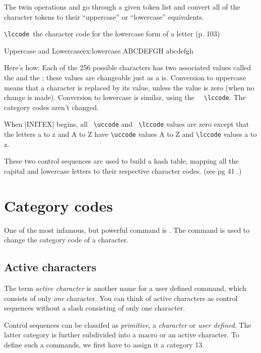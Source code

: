 The twin operations  and 
go through a given token list and convert all of the character tokens to their
\enquote{uppercase}  or \enquote{lowercase} equivalents.

\verb*+\lccode +the character code for the lowercase form of a letter (p. 103)

\begin{texexample}{Uppercase and Lowercase}{ex:lowercase} 
\uppercase{abcdefgh} 
\lowercase{ABCDEFGH}
\end{texexample}

Here's how: Each of the 256 possible characters has two associated values called the \cmd{\uccode} and the \cmd{\lccode}; these values are
changeable just as a \cmd{\catcode} is. Conversion to uppercase means that a character
is replaced by its \cmd{\uccode} value, unless the \cmd{\uccode} value is zero (when no change
is made). Conversion to lowercase is similar, using the
\verb+  \lccode+. The category codes
aren't changed. 

When |INITEX| begins, all \verb+ \uccode+ and \verb+ \lccode+ values are zero except
that the letters a to z and A to Z have \verb+\uccode+ values A to Z and \verb+\lccode+ values a to z.

These two control sequences are used to build a hash table, mapping all the capital and lowercase letters to their respective character codes.
(see pg 41 \texbook.)

\section{Category codes}

One of the most infamous, but powerful \tex command is . The command is used to change the category code of a character.

\subsection{Active characters}

The term \emph{active character} is another name for a user defined command, which consists of only \emph{one} character. You can think of active characters as control sequences without a slash consisting of only one character. 

Control sequences can be classifed as \emph{primitive}, a \emph{character} or \emph{user defined}. The latter category is further subdivided into a macro or an active character. To define such a commands, we first have to assign it a category 13. 

